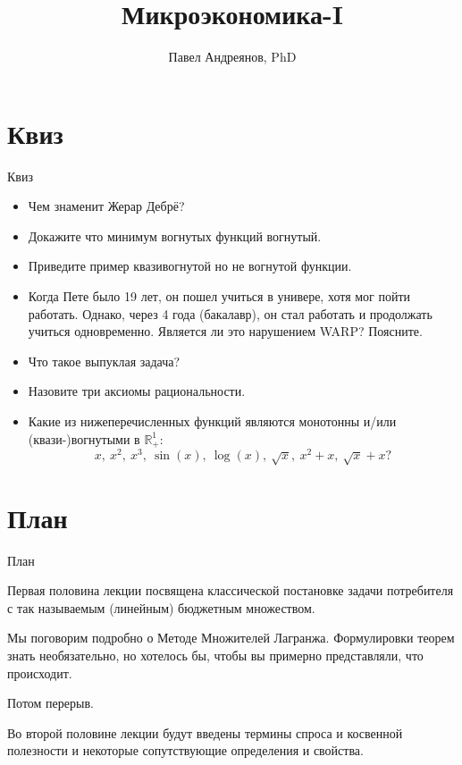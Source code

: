 \documentclass{beamer}
\title{
Микроэкономика-I
}
\author{
Павел Андреянов, PhD
}
\begin{document}
\maketitle

\section{Квиз}

\begin{frame}{Квиз}

\begin{itemize}
  \item Чем знаменит Жерар Дебрё? \pause
  \item Докажите что минимум вогнутых функций вогнутый. \pause
  \item Приведите пример квазивогнутой но не вогнутой функции. \pause
  \item Когда Пете было 19 лет, он пошел учиться в универе, хотя мог пойти работать. Однако, через 4 года (бакалавр), он стал работать и продолжать учиться одновременно. Является ли это нарушением WARP? Поясните.  \pause
  \item Что такое выпуклая задача? \pause
  \item Назовите три аксиомы рациональности. \pause
  \item Какие из нижеперечисленных функций являются монотонны и/или (квази-)вогнутыми в $\mathbb{R}^1_+$: $$x, \ x^2, \ x^3, \ \sin(x), \ \log(x), \ \sqrt{x}, \ x^2 + x, \ \sqrt{x} + x?$$
\end{itemize}

\end{frame}

\section{План}

\begin{frame}{План}

Первая половина лекции посвящена классической постановке задачи потребителя с так называемым (линейным) бюджетным множеством.

Мы поговорим подробно о Методе Множителей Лагранжа. Формулировки теорем знать необязательно, но хотелось бы, чтобы вы примерно представляли, что происходит.

Потом перерыв.

Во второй половине лекции будут введены термины спроса и косвенной полезности и некоторые сопутствующие определения и свойства.

\end{frame}
\end{document}
